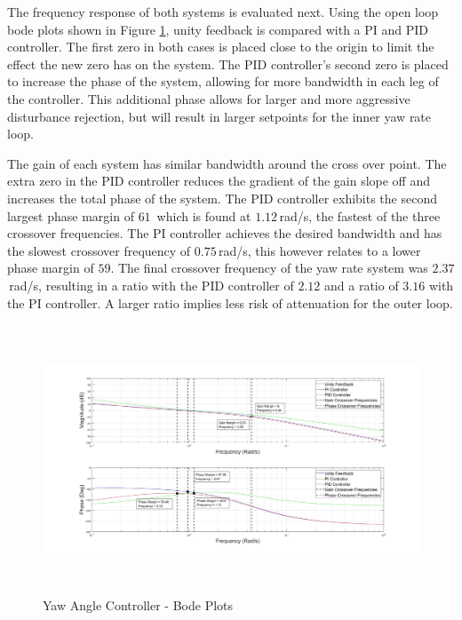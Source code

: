 	The frequency response of both systems is evaluated next. Using the open loop bode plots shown in Figure \ref{IM_YawAngleControlBode}, unity feedback is compared with a PI and PID controller. The first zero in both cases is placed close to the origin to limit the effect the new zero has on the system. The PID controller's second zero is placed to increase the phase of the system, allowing for more bandwidth in each leg of the controller. This additional phase allows for larger and more aggressive disturbance rejection, but will result in larger setpoints for the inner yaw rate loop.
	
	The gain of each system has similar bandwidth around the cross over point. The extra zero in the PID controller reduces the gradient of the gain slope off and increases the total phase of the system. The PID controller exhibits the second largest phase margin of $61$\textdegree\ which is found at $1.12$\,rad/s, the fastest of the three crossover frequencies. The PI controller achieves the desired bandwidth and has the slowest crossover frequency of $0.75$\,rad/s, this however relates to a lower phase margin of $59$\textdegree. The final crossover frequency of the yaw rate system was $2.37$\,rad/s, resulting in a ratio with the PID controller of $2.12$ and a ratio of $3.16$ with the PI controller. A larger ratio implies less risk of attenuation for the outer loop.
	
	\begin{figure}[H]
		\centering
		\includegraphics[height = 8cm]{../Design/Matlab/Controllers/yaw_angle_bode.jpg}
		\caption{Yaw Angle Controller -  Bode Plots}
		\label{IM_YawAngleControlBode}
	\end{figure}
	
